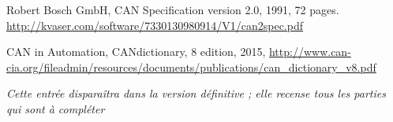 


\small{
\begin{thebibliography}{99}
\thispagestyle{empty}



Robert Bosch GmbH, CAN Specification version 2.0, 1991, 72 pages. \url{http://kvaser.com/software/7330130980914/V1/can2spec.pdf} 

CAN in Automation, CANdictionary, 8 edition, 2015, \url{http://www.can-cia.org/fileadmin/resources/documents/publications/can_dictionary_v8.pdf}


\emph{Cette entrée disparaîtra dans la version définitive ; elle recense tous les parties qui sont à compléter}







\end{thebibliography}
}